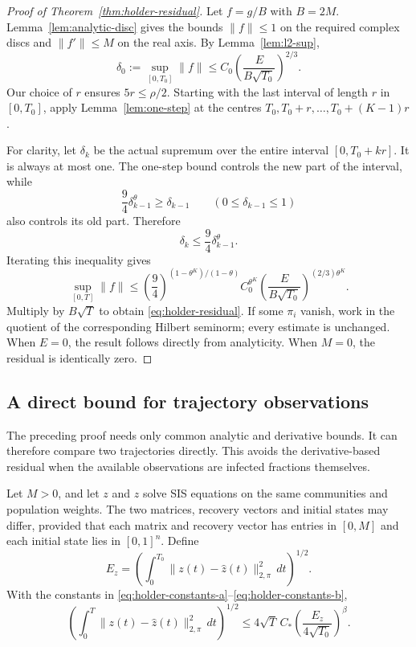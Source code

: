 \begin{proof}[Proof of Theorem~\ref{thm:holder-residual}]
Let $f=g/B$ with $B=2M$. Lemma~\ref{lem:analytic-disc} gives the bounds $\|f\|\leq1$ on the required complex discs and $\|f'\|\leq M$ on the real axis. By Lemma~\ref{lem:l2-sup},
\[
 \delta_0:=\sup_{[0,T_0]}\|f\|
 \leq C_0\left(\frac{E}{B\sqrt{T_0}}\right)^{2/3}.
\]
Our choice of $r$ ensures $5r\leq\rho/2$. Starting with the last interval of length $r$ in $[0,T_0]$, apply Lemma~\ref{lem:one-step} at the centres $T_0,T_0+r,\ldots,T_0+(K-1)r$.

For clarity, let $\delta_k$ be the actual supremum over the entire interval $[0,T_0+kr]$. It is always at most one. The one-step bound controls the new part of the interval, while
\[
 \frac94\delta_{k-1}^\theta\geq\delta_{k-1}
 \qquad(0\leq\delta_{k-1}\leq1)
\]
also controls its old part. Therefore
\[
 \delta_k\leq\frac94\delta_{k-1}^\theta.
\]
Iterating this inequality gives
\[
 \sup_{[0,T]}\|f\|
 \leq\left(\frac94\right)^{(1-\theta^K)/(1-\theta)}
 C_0^{\theta^K}
 \left(\frac{E}{B\sqrt{T_0}}\right)^{(2/3)\theta^K}.
\]
Multiply by $B\sqrt T$ to obtain \eqref{eq:holder-residual}. If some $\pi_i$ vanish, work in the quotient of the corresponding Hilbert seminorm; every estimate is unchanged. When $E=0$, the result follows directly from analyticity. When $M=0$, the residual is identically zero.
\end{proof}

\subsection{A direct bound for trajectory observations}

The preceding proof needs only common analytic and derivative bounds. It can therefore compare two trajectories directly. This avoids the derivative-based residual when the available observations are infected fractions themselves.

\begin{corollary}
\label{cor:trajectory-holder}
Let $M>0$, and let $z$ and $\widehat z$ solve SIS equations on the same communities and population weights. The two matrices, recovery vectors and initial states may differ, provided that each matrix and recovery vector has entries in $[0,M]$ and each initial state lies in $[0,1]^n$. Define
\[
 E_z=\left(\int_0^{T_0}\|z(t)-\widehat z(t)\|_{2,\pi}^2\,dt\right)^{1/2}.
\]
With the constants in \eqref{eq:holder-constants-a}--\eqref{eq:holder-constants-b},
\begin{equation}
 \left(\int_0^T\|z(t)-\widehat z(t)\|_{2,\pi}^2\,dt\right)^{1/2}
 \leq4\sqrt T\,C_*
 \left(\frac{E_z}{4\sqrt{T_0}}\right)^\beta.
 \label{eq:trajectory-holder}
\end{equation}
\end{corollary}

